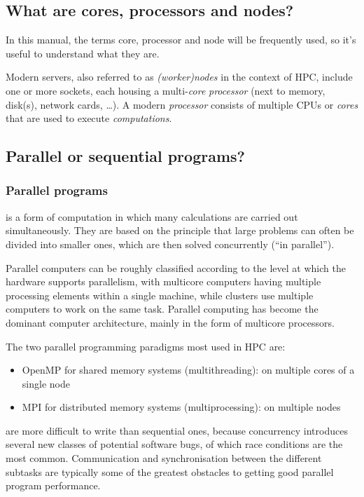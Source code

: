 \subsection{What are cores, processors and nodes?}

In this manual, the terms core, processor and node will be frequently used,
so it's useful to understand what they are.

Modern servers, also referred to as \emph{(worker)nodes} in the context of HPC,
include one or more sockets, each housing a multi-\emph{core} \emph{processor} (next to
memory, disk(s), network cards, \ldots). A modern \emph{processor} consists of
multiple CPUs or \emph{cores} that are used to execute \emph{computations}.

\subsection{Parallel or sequential programs?}
\label{sec:parallel-or-sequential-programs}

\subsubsection{Parallel programs}


 is a form of computation in which many calculations
are carried out simultaneously. They are based on the principle that large
problems can often be divided into smaller ones, which are then solved
concurrently (``in parallel'').

Parallel computers can be roughly classified according to the level at which
the hardware supports parallelism, with multicore computers having multiple
processing elements within a single machine, while clusters use multiple
computers to work on the same task. Parallel computing has become the dominant
computer architecture, mainly in the form of multicore processors.

The two parallel programming paradigms most used in HPC are:

\begin{itemize}
    \item OpenMP for shared memory systems (multithreading): on multiple cores of a single node
    \item MPI for distributed memory systems (multiprocessing): on multiple nodes
\end{itemize}

 are more difficult to write than sequential ones,
because concurrency introduces several new classes of potential software bugs,
of which race conditions are the most common. Communication and synchronisation
between the different subtasks are typically some of the greatest obstacles to
getting good parallel program performance.

